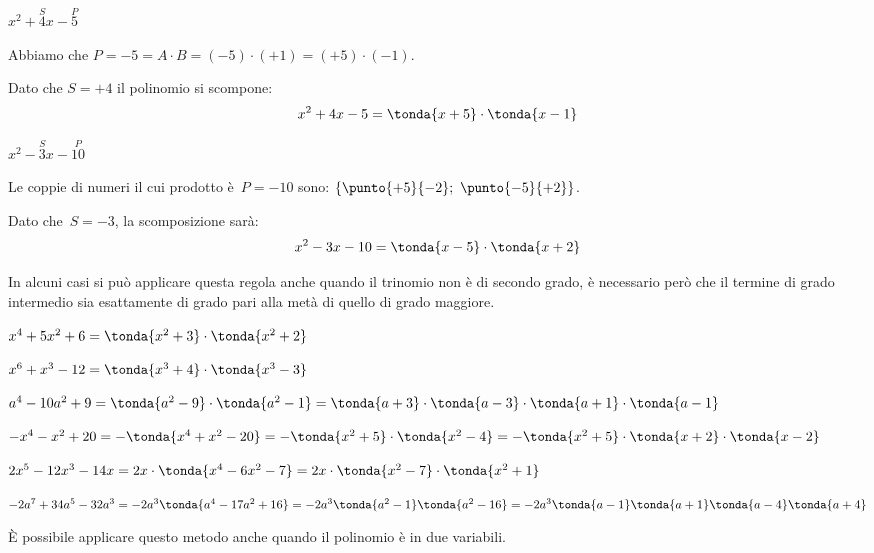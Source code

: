 
\begin{esempio}
 \(x^2+\overset{S}{4}x-\overset{P}{5}\)

Abbiamo che \(P = -5 = A \cdot B = (-5) \cdot (+1) = (+5) \cdot (-1)\).

Dato che \(S = +4\) il polinomio si scompone:
\[x^2+4x-5=\tonda{x+5}\cdot \tonda{x-1}\]
\end{esempio}

\begin{esempio}
 \(x^2-\overset{S}{3}x-\overset{P}{10}\)

Le coppie di numeri il cui prodotto è~\(P=-10\) sono:
\(\{\punto{+5}{-2};~\punto{-5}{+2}\}\).

Dato che~\(S=-3\), la scomposizione sarà:
\[x^2-3x-10=\tonda{x-5}\cdot \tonda{x+2}\]
\end{esempio}

\begin{esempio}
 In alcuni casi si può applicare questa regola anche quando il trinomio
non è di secondo grado, è necessario però che il termine di grado
intermedio sia esattamente di grado pari alla metà di quello di grado
maggiore.

\begin{itemize*}
\item \(x^4+5x^2+6=\tonda{x^2+3}\cdot \tonda{x^2+2}\)
\item \(x^6+x^3-12=\tonda{x^3+4}\cdot \tonda{x^3-3}\)
\item \(a^{4}-10a^{2}+9=\tonda{a^{2}-9}\cdot\tonda{a^{2}-1}=
       \tonda{a+3}\cdot \tonda{a-3}\cdot 
       \tonda{a+1}\cdot\tonda{a-1}\)
\item \(-x^4-x^2+20=-\tonda{x^4+x^2-20}=
       -\tonda{x^2+5}\cdot\tonda{x^2-4}=
       -\tonda{x^2+5}\cdot\tonda{x+2}\cdot \tonda{x-2}\)
\item \(2x^{5}-12x^3-14x=2x\cdot \tonda{x^4-6x^2-7}=2x\cdot%
\tonda{x^2-7}\cdot \tonda{x^2+1}\)
\item \(-2a^{7}+34a^{5}-32a^{3}=-2a^{3}\tonda{a^{4}-17a^{2}+16}
    =-2a^{3}\tonda{a^{2}-1}\tonda{a^{2}-16}\\
=-2a^{3}\tonda{a-1}\tonda{a+1}\tonda{a-4}\tonda{a+4}\)
\end{itemize*}
\end{esempio}


È possibile applicare questo metodo anche quando il
polinomio è in due variabili.

